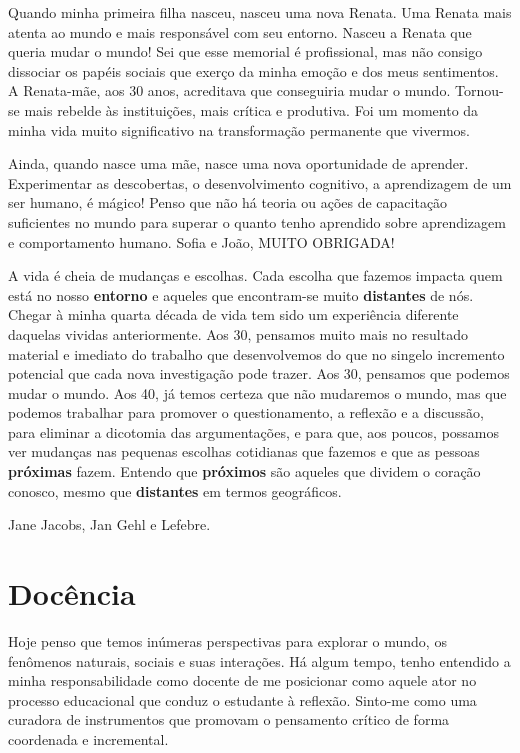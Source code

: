 \documentclass[
]{book}
\begin{document}
Quando minha primeira filha nasceu, nasceu uma nova Renata. Uma Renata mais atenta ao mundo e mais responsável com seu entorno. Nasceu a Renata que queria mudar o mundo! Sei que esse memorial é profissional, mas não consigo dissociar os papéis sociais que exerço da minha emoção e dos meus sentimentos. A Renata-mãe, aos 30 anos, acreditava que conseguiria mudar o mundo. Tornou-se mais rebelde às instituições, mais crítica e produtiva. Foi um momento da minha vida muito significativo na transformação permanente que vivermos.

Ainda, quando nasce uma mãe, nasce uma nova oportunidade de aprender. Experimentar as descobertas, o desenvolvimento cognitivo, a aprendizagem de um ser humano, é mágico! Penso que não há teoria ou ações de capacitação suficientes no mundo para superar o quanto tenho aprendido sobre aprendizagem e comportamento humano. Sofia e João, MUITO OBRIGADA!

A vida é cheia de mudanças e escolhas. Cada escolha que fazemos impacta quem está no nosso \textbf{entorno} e aqueles que encontram-se muito \textbf{distantes} de nós. Chegar à minha quarta década de vida tem sido um experiência diferente daquelas vividas anteriormente. Aos 30, pensamos muito mais no resultado material e imediato do trabalho que desenvolvemos do que no singelo incremento potencial que cada nova investigação pode trazer. Aos 30, pensamos que podemos mudar o mundo. Aos 40, já temos certeza que não mudaremos o mundo, mas que podemos trabalhar para promover o questionamento, a reflexão e a discussão, para eliminar a dicotomia das argumentações, e para que, aos poucos, possamos ver mudanças nas pequenas escolhas cotidianas que fazemos e que as pessoas \textbf{próximas} fazem. Entendo que \textbf{próximos} são aqueles que dividem o coração conosco, mesmo que \textbf{distantes} em termos geográficos.

Jane Jacobs, Jan Gehl e Lefebre.

\hypertarget{docuxeancia}{%
\section{Docência}\label{docuxeancia}}

Hoje penso que temos inúmeras perspectivas para explorar o mundo, os fenômenos naturais, sociais e suas interações. Há algum tempo, tenho entendido a minha responsabilidade como docente de me posicionar como aquele ator no processo educacional que conduz o estudante à reflexão. Sinto-me como uma curadora de instrumentos que promovam o pensamento crítico de forma coordenada e incremental.
\end{document}
